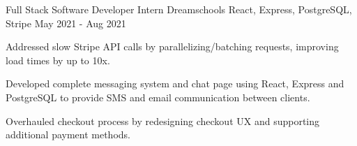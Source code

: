 \begin{cventries}

  \cventry
    {Full Stack Software Developer Intern} %
    {Dreamschools} %
    {React, Express, PostgreSQL, Stripe} %
    {May 2021 - Aug 2021} %
    {
      \begin{cvitems} %
        \item {Addressed slow {Stripe} API calls by parallelizing/batching requests, improving load times by up to 10x.}
        \item {Developed complete messaging system and chat page using {React}, {Express} and {PostgreSQL} to provide SMS and email communication between clients.}
        \item {Overhauled checkout process by redesigning checkout UX and supporting additional payment methods.}
      \end{cvitems}
    }
\end{cventries}
